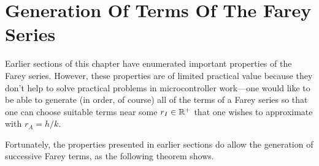 \section{Generation Of Terms Of The Farey Series}
\label{cfry0:sgfs0}


Earlier sections of this chapter have enumerated important properties of the
Farey series.  However, these properties are of limited practical value
because they don't help to solve practical problems in microcontroller
work---one would like to be able to generate (in order, of course) all of
the terms of a Farey series so that one can choose suitable terms
near some $r_I \in {\mathbb{R}^+}$ that one wishes to approximate 
with $r_A = h/k$.

Fortunately, the properties presented in earlier sections do allow the
generation of successive Farey terms, as the following theorem shows.

